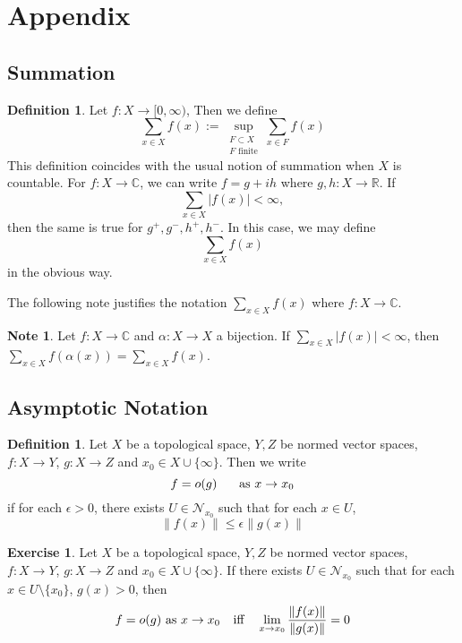 \documentclass[12pt]{amsart}
\theoremstyle{definition}
\newtheorem{defn}[definition]{Definition}
\newtheorem{note}[definition]{Note}
\newtheorem{ex}[definition]{Exercise}
\newcommand{\al}{\alpha}
\newcommand{\ep}{\epsilon}
\newcommand{\C}{\mathbb{C}}
\newcommand{\R}{\mathbb{R}}
\newcommand{\MN}{\mathcal{N}}
\newcommand{\Rg}{[0,\infty)}
\newcommand{\lex}[1]{\label{ex:#1}}
\newcommand{\ld}[1]{\label{defn:#1}}
\begin{document}
	
	
	
	
	
	
	
	
	
	
	\newpage
	\section{Appendix}
	
	\subsection{Summation}
	
	\begin{defn} \ld{}
		Let $f:X \rightarrow \Rg$, Then we define $$\sum_{x \in X} f(x) := \sup_{\substack{F \subset X \\ F \text{ finite}}} \sum_{x \in F} f(x)$$ This definition coincides with the usual notion of summation when $X$ is countable. For $f:X \rightarrow \C$, we can write $f = g +ih$ where $g,h:X \rightarrow \R$. If $$\sum_{x \in X}|f(x)| < \infty,$$ then the same is true for $g^+,g^-,h^+,h^-$. In this case, we may define $$\sum_{x \in X} f(x)$$ in the obvious way.
	\end{defn} 
	
	The following note justifies the notation $\sum_{x \in X}f(x)$ where $f:X \rightarrow \C$.
	
	\begin{note}
		Let $f:X \rightarrow \C$ and $\al:X \rightarrow X$ a bijection. If $\sum_{x \in X}|f(x)|< \infty$, then $\sum_{x \in X}f( \al (x)) = \sum_{x \in X}f(x) $.
	\end{note}
	
	\newpage	
	
	\subsection{Asymptotic Notation}
	
	\begin{defn} \ld{}
	Let $X$ be a topological space, $Y, Z$ be normed vector spaces, $f:X \rightarrow Y$, $g: X \rightarrow Z$ and $x_0 \in X \cup \{\infty\}$. Then we write $$f = o(g) \hspace{.5cm} \text{ as } x \rightarrow x_0$$ if for each $\ep >0$, there exists $U \in \MN_{x_0}$ such that for each $x \in U$, $$\|f(x)\| \leq \ep\|g(x)\|$$
	\end{defn}
	
	\begin{ex} \lex{}
	Let $X$ be a topological space, $Y, Z$ be normed vector spaces, $f:X \rightarrow Y$, $g: X \rightarrow Z$ and $x_0 \in X \cup \{\infty\}$. If there exists $U \in \MN_{x_0}$ such that for each $x \in U \setminus \{x_0\}$, $g(x) > 0$, then $$f = o(g) \text{ as } x \rightarrow x_0 \hspace{.25cm} \text{ iff } \hspace{.25cm}  \lim_{x \rightarrow x_0} \frac{\| f(x) \|}{\| g(x) \|} = 0$$
	\end{ex}	
	
\end{document}
